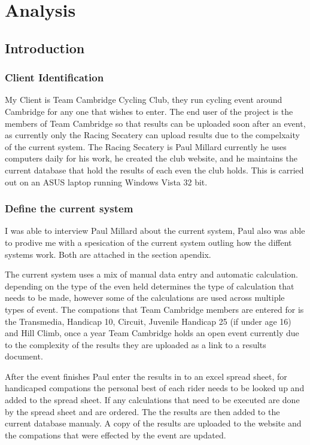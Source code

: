 \chapter{Analysis}

\section{Introduction}

\subsection{Client Identification}
My Client is Team Cambridge Cycling Club, they run cycling event around Cambridge for any one that wishes to enter. The end user of the project is the members of Team Cambridge so that results can be uploaded soon after an event, as currently only the Racing Secatery can upload results due to the compelxaity of the current system. The Racing Secatery is Paul Millard currently he uses computers daily for his work, he created the club website, and he maintains the current database that hold the results of each even the club holds. This is carried out on an ASUS laptop running Windows Vista 32 bit.
\subsection{Define the current system}
I was able to interview Paul Millard about the current system, Paul also was able to prodive me with a spesication of the current system outling how the diffent systems work. Both are attached in the section apendix.

The current system uses a mix of manual data entry and automatic calculation. depending on the type of the even held determines the type of calculation that needs to be made, however some of the calculations are used across multiple types of event. The compations that Team Cambridge members are entered for is the Transmedia, Handicap 10, Circuit, Juvenile Handicap 25 (if under age 16) and Hill Climb, once a year Team Cambridge holds an open event currently due to the complexity of the results they are uploaded as a link to a  results document. 

After the event finishes Paul enter the results in to an excel spread sheet, for handicaped compations the personal best of each rider needs to be looked up and added to the spread sheet. If any calculations that need to be executed are done by the spread sheet and are ordered. The the results are then added to the current database manualy. A copy of the results are uploaded to the website and the compations that were effected by the event are updated.

